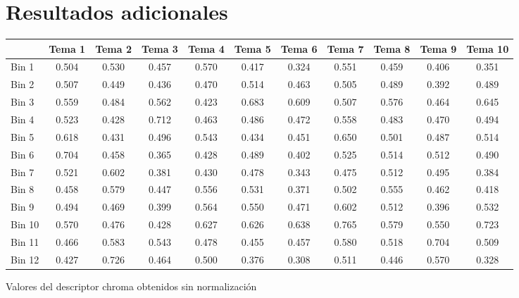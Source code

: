 \documentclass[]{article}
\makeatletter
\newcommand{\tabla}[4]{
\begin{tablehere}
\begin{center}
\begin{tabular}{#1}
#2
\end{tabular}
\caption{#3}
\label{#4}
\end{center}
\end{tablehere}
}
\newenvironment{tablehere}    %
  {\def\@captype{table}}    %

  {}              %
\makeatother
\begin{document}
\appendix
\section{Resultados adicionales}

\tabla
{|l|c|c|c|c|c|c|c|c|c|c|}
{
\hline
 &Tema 1 & Tema 2 & Tema 3 & Tema 4 & Tema 5 & Tema 6 & Tema 7 & Tema 8 & Tema 9 & Tema 10 \\
\hline
Bin 1 & 0.504 & 0.530 & 0.457 & 0.570 & 0.417 & 0.324 & 0.551 & 0.459 & 0.406 & 0.351 \\
\hline
Bin 2 & 0.507 & 0.449 & 0.436 & 0.470 & 0.514 & 0.463 & 0.505 & 0.489 & 0.392 & 0.489 \\
\hline
Bin 3 & 0.559 & 0.484 & 0.562 & 0.423 & 0.683 & 0.609 & 0.507 & 0.576 & 0.464 & 0.645 \\
\hline
Bin 4 & 0.523 & 0.428 & 0.712 & 0.463 & 0.486 & 0.472 & 0.558 & 0.483 & 0.470 & 0.494 \\
\hline
Bin 5 & 0.618 & 0.431 & 0.496 & 0.543 & 0.434 & 0.451 & 0.650 & 0.501 & 0.487 & 0.514 \\
\hline
Bin 6 & 0.704 & 0.458 & 0.365 & 0.428 & 0.489 & 0.402 & 0.525 & 0.514 & 0.512 & 0.490 \\
\hline
Bin 7 & 0.521 & 0.602 & 0.381 & 0.430 & 0.478 & 0.343 & 0.475 & 0.512 & 0.495 & 0.384 \\
\hline
Bin 8 & 0.458 & 0.579 & 0.447 & 0.556 & 0.531 & 0.371 & 0.502 & 0.555 & 0.462 & 0.418 \\
\hline
Bin 9 & 0.494 & 0.469 & 0.399 & 0.564 & 0.550 & 0.471 & 0.602 & 0.512 & 0.396 & 0.532 \\
\hline
Bin 10 & 0.570 & 0.476 & 0.428 & 0.627 & 0.626 & 0.638 & 0.765 & 0.579 & 0.550 & 0.723 \\
\hline
Bin 11 & 0.466 & 0.583 & 0.543 & 0.478 & 0.455 & 0.457 & 0.580 & 0.518 & 0.704 & 0.509 \\
\hline
Bin 12 & 0.427 & 0.726 & 0.464 & 0.500 & 0.376 & 0.308 & 0.511 & 0.446 & 0.570 & 0.328 \\
\hline
}
{Valores del descriptor chroma obtenidos sin normalización}
{tab: chroma}
\end{document}
